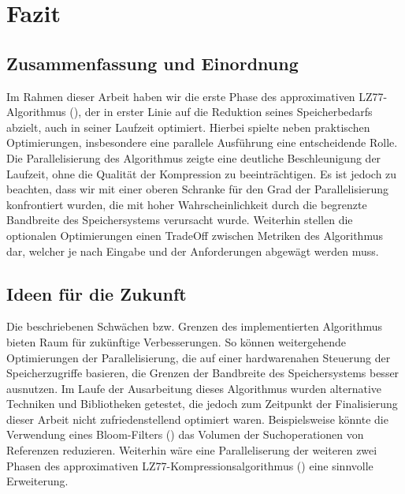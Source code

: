 \chapter{Fazit}
\section{Zusammenfassung und Einordnung}
Im Rahmen dieser Arbeit haben wir die erste Phase des approximativen LZ77-Algorithmus (\cite{ApproxLZ77}), der in erster Linie auf die Reduktion
seines Speicherbedarfs abzielt, auch in seiner Laufzeit optimiert. Hierbei spielte neben praktischen Optimierungen, insbesondere eine 
parallele Ausführung eine entscheidende Rolle. Die Parallelisierung des Algorithmus zeigte eine deutliche Beschleunigung der Laufzeit, ohne
die Qualität der Kompression zu beeinträchtigen. Es ist jedoch zu beachten, dass wir mit einer oberen Schranke für den Grad der Parallelisierung
konfrontiert wurden, die mit hoher Wahrscheinlichkeit durch die begrenzte Bandbreite des Speichersystems verursacht wurde. Weiterhin
stellen die optionalen Optimierungen einen TradeOff zwischen Metriken des Algorithmus dar, welcher je nach Eingabe und der Anforderungen
abgewägt werden muss.

\section{Ideen für die Zukunft}
Die beschriebenen Schwächen bzw. Grenzen des implementierten Algorithmus bieten Raum für zukünftige Verbesserungen. So können weitergehende
Optimierungen der Parallelisierung, die auf einer hardwarenahen Steuerung der Speicherzugriffe basieren, die Grenzen der Bandbreite des Speichersystems
besser ausnutzen. Im Laufe der Ausarbeitung dieses Algorithmus wurden alternative Techniken und Bibliotheken getestet, die jedoch zum Zeitpunkt
der Finalisierung dieser Arbeit nicht zufriedenstellend optimiert waren. Beispielsweise könnte die Verwendung eines Bloom-Filters (\cite{bloom}) das Volumen
der Suchoperationen von Referenzen reduzieren. Weiterhin wäre eine Paralleliserung der weiteren zwei Phasen des approximativen LZ77-Kompressionsalgorithmus
(\cite{ApproxLZ77}) eine sinnvolle Erweiterung.